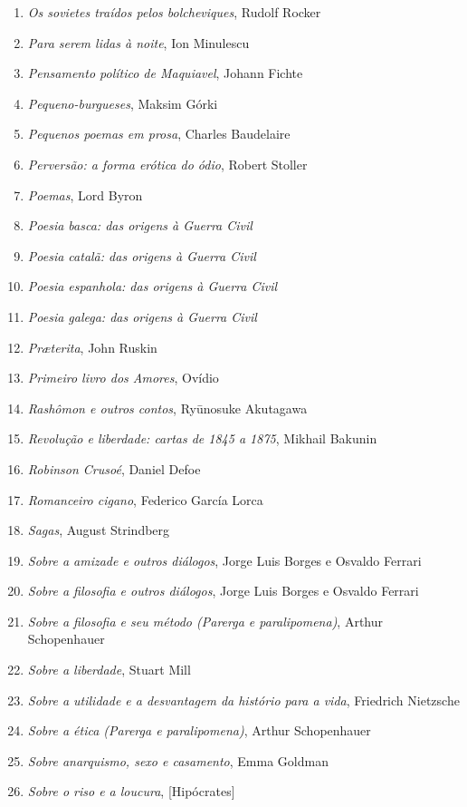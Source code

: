 \begin{enumerate}
\item \textit{Os sovietes traídos pelos bolcheviques}, Rudolf Rocker
\item \textit{Para serem lidas à noite}, Ion Minulescu
\item \textit{Pensamento político de Maquiavel}, Johann Fichte
\item \textit{Pequeno-burgueses}, Maksim Górki
\item \textit{Pequenos poemas em prosa}, Charles Baudelaire
\item \textit{Perversão: a forma erótica do ódio}, Robert Stoller
\item \textit{Poemas}, Lord Byron
\item \textit{Poesia basca: das origens à Guerra Civil} 
\item \textit{Poesia catalã: das origens à Guerra Civil} 
\item \textit{Poesia espanhola: das origens à Guerra Civil} 
\item \textit{Poesia galega: das origens à Guerra Civil} 
\item \textit{Pr\ae terita}, John Ruskin
\item \textit{Primeiro livro dos Amores}, Ovídio
\item \textit{Rashômon e outros contos}, Ryūnosuke Akutagawa
\item \textit{Revolução e liberdade: cartas de 1845 a 1875}, Mikhail Bakunin
\item \textit{Robinson Crusoé}, Daniel Defoe
\item \textit{Romanceiro cigano}, Federico García Lorca
\item \textit{Sagas}, August Strindberg
\item \textit{Sobre a amizade e outros diálogos}, Jorge Luis Borges e Osvaldo Ferrari
\item \textit{Sobre a filosofia e outros diálogos}, Jorge Luis Borges e Osvaldo Ferrari
\item \textit{Sobre a filosofia e seu método (Parerga e paralipomena)}, Arthur Schopenhauer 
\item \textit{Sobre a liberdade}, Stuart Mill
\item \textit{Sobre a utilidade e a desvantagem da histório para a vida}, Friedrich Nietzsche
\item \textit{Sobre a ética (Parerga e paralipomena)}, Arthur Schopenhauer 
\item \textit{Sobre anarquismo, sexo e casamento}, Emma Goldman
\item \textit{Sobre o riso e a loucura}, [Hipócrates]

\end{enumerate}
